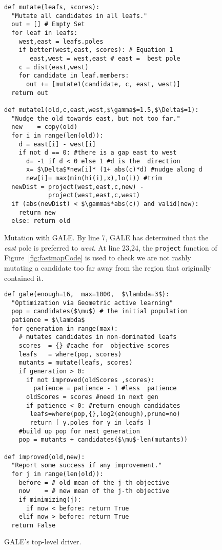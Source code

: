 \documentclass[10pt,journal,compsoc]{IEEEtran}
\newcommand{\fig}[1]{Figure~\ref{fig:#1}}
\begin{document}
\begin{figure}[!t]
\begin{minipage}{3.2in}
\begin{lstlisting}[mathescape,frame=r,numbers=right]
def mutate(leafs, scores): 
  "Mutate all candidates in all leafs."
  out = [] # Empty Set
  for leaf in leafs:
    west,east = leafs.poles
    if better(west,east, scores): # Equation 1
       east,west = west,east # east =  best pole
    c = dist(east,west)
    for candidate in leaf.members:
      out += [mutate1(candidate, c, east, west)]
  return out 

def mutate1(old,c,east,west,$\gamma$=1.5,$\Delta$=1): 
  "Nudge the old towards east, but not too far."
  new    = copy(old)
  for i in range(len(old)):
    d = east[i] - west[i]
    if not d == 0: #there is a gap east to west
      d= -1 if d < 0 else 1 #d is the  direction
      x= $\Delta$*new[i]* (1+ abs(c)*d) #nudge along d 
      new[i]= max(min(hi(i),x),lo(i)) #trim 
  newDist = project(west,east,c,new) -
            project(west,east,c,west)
  if (abs(newDist) < $\gamma$*abs(c)) and valid(new): 
    return new
  else: return old
\end{lstlisting}

\caption{Mutation with GALE.
By line 7, GALE has determined that the {\em east}
pole is preferred  to {\em west}.
At line 23,24, the {\tt project}
function of \fig{fastmapCode}  is used
to check 
we are not rashly mutating a candidate too far away from
the region that originally contained it.}
\label{fig:mutantCode} 
\end{minipage}
\end{figure}
\begin{figure}[!t]
\begin{minipage}{3.2in}
\begin{lstlisting}[mathescape,frame=r,numbers=right]
def gale(enough=16,  max=1000,  $\lambda=3$):
  "Optimization via Geometric active learning"
  pop = candidates($\mu$) # the initial population
  patience = $\lambda$
  for generation in range(max):
    # mutates candidates in non-dominated leafs
    scores  = {} #cache for  objective scores 
    leafs   = where(pop, scores)
    mutants = mutate(leafs, scores)
    if generation > 0:  
      if not improved(oldScores ,scores):
        patience = patience - 1 #less  patience
      oldScores = scores #need in next gen
      if patience < 0: #return enough candidates
       leafs=where(pop,{},log2(enough),prune=no)
       return [ y.poles for y in leafs ] 
    #build up pop for next generation
    pop = mutants + candidates($\mu$-len(mutants))   

def improved(old,new):
  "Report some success if any improvement."
  for j in range(len(old)):
    before = # old mean of the j-th objective
    now    = # new mean of the j-th objective
    if minimizing(j):
      if now < before: return True
    elif now > before: return True
  return False 
\end{lstlisting}

\caption{GALE's top-level driver.}
\label{fig:galeCode}
\end{minipage}
\end{figure}
\end{document}
